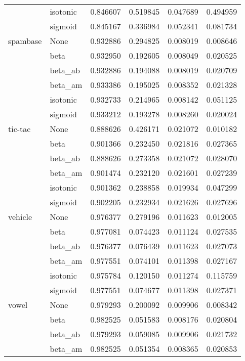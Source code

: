 \begin{tabular}{llrrrr}
        & isotonic &  0.846607 &  0.519845 &  0.047689 &  0.494959 \\
        & sigmoid &  0.845167 &  0.336984 &  0.052341 &  0.081734 \\
spambase & None &  0.932886 &  0.294825 &  0.008019 &  0.008646 \\
        & beta &  0.932950 &  0.192605 &  0.008049 &  0.020525 \\
        & beta\_ab &  0.932886 &  0.194088 &  0.008019 &  0.020709 \\
        & beta\_am &  0.933386 &  0.195025 &  0.008352 &  0.021328 \\
        & isotonic &  0.932733 &  0.214965 &  0.008142 &  0.051125 \\
        & sigmoid &  0.933212 &  0.193278 &  0.008260 &  0.020024 \\
tic-tac & None &  0.888626 &  0.426171 &  0.021072 &  0.010182 \\
        & beta &  0.901366 &  0.232450 &  0.021816 &  0.027365 \\
        & beta\_ab &  0.888626 &  0.273358 &  0.021072 &  0.028070 \\
        & beta\_am &  0.901474 &  0.232120 &  0.021601 &  0.027239 \\
        & isotonic &  0.901362 &  0.238858 &  0.019934 &  0.047299 \\
        & sigmoid &  0.902205 &  0.232934 &  0.021626 &  0.027696 \\
vehicle & None &  0.976377 &  0.279196 &  0.011623 &  0.012005 \\
        & beta &  0.977081 &  0.074423 &  0.011124 &  0.027535 \\
        & beta\_ab &  0.976377 &  0.076439 &  0.011623 &  0.027073 \\
        & beta\_am &  0.977551 &  0.074101 &  0.011398 &  0.027167 \\
        & isotonic &  0.975784 &  0.120150 &  0.011274 &  0.115759 \\
        & sigmoid &  0.977551 &  0.074677 &  0.011398 &  0.027371 \\
vowel & None &  0.979293 &  0.200092 &  0.009906 &  0.008342 \\
        & beta &  0.982525 &  0.051583 &  0.008176 &  0.020804 \\
        & beta\_ab &  0.979293 &  0.059085 &  0.009906 &  0.021732 \\
        & beta\_am &  0.982525 &  0.051354 &  0.008365 &  0.020853 \\

\end{tabular}
